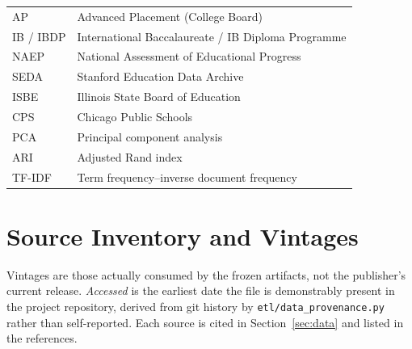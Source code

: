\documentclass[12pt]{article}
\begin{document}
{\begin{longtable}{@{}ll@{}}
AP & Advanced Placement (College Board) \\
IB / IBDP & International Baccalaureate / IB Diploma Programme \\
NAEP & National Assessment of Educational Progress \\
SEDA & Stanford Education Data Archive \\
ISBE & Illinois State Board of Education \\
CPS & Chicago Public Schools \\
PCA & Principal component analysis \\
ARI & Adjusted Rand index \\
TF-IDF & Term frequency--inverse document frequency \\
\bottomrule
\end{longtable}}\addtocounter{table}{-1}

\clearpage
\section{Source Inventory and Vintages}
\label{app:sources}

Vintages are those actually consumed by the frozen artifacts, not the publisher's current release. \emph{Accessed} is the earliest date the file is demonstrably present in the project repository, derived from git history by \texttt{etl/data\_provenance.py} rather than self-reported. Each source is cited in Section~\ref{sec:data} and listed in the references.
\end{document}
